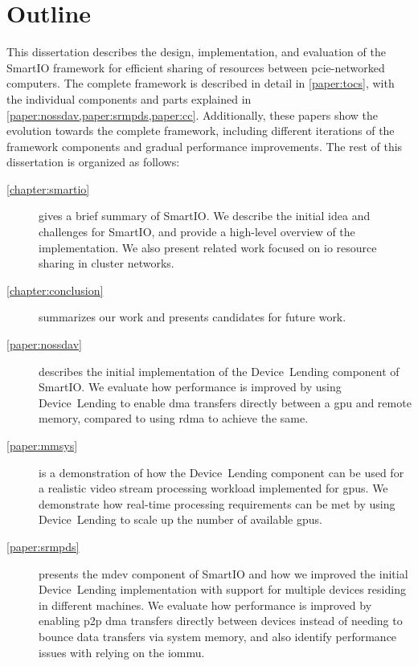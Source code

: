 \section{Outline}
This dissertation describes the design, implementation, and evaluation of the SmartIO framework for efficient sharing of resources between \gls{pcie}-networked computers.
%
The complete framework is described in detail in \cref{paper:tocs}, with the individual components and parts explained in \cref{paper:nossdav,paper:srmpds,paper:cc}.
%
Additionally, these papers show the evolution towards the complete framework, including different iterations of the framework components and gradual performance improvements.
%
The rest of this dissertation is organized as follows:
%
\begin{description}
    \item[\cref{chapter:smartio}]
        gives a brief summary of SmartIO.
        We describe the initial idea and challenges for SmartIO, and provide a high-level overview of the implementation.
        We also present related work focused on \gls{io} resource sharing in cluster networks.

    \item[\cref{chapter:conclusion}]
        summarizes our work and presents candidates for future work.

    \item[\cref{paper:nossdav}]
        describes the initial implementation of the Device~Lending component of SmartIO.
        We evaluate how performance is improved by using Device~Lending to enable \gls{dma} transfers directly between a \gls{gpu} and remote memory, compared to using \gls{rdma} to achieve the same.

    \item[\cref{paper:mmsys}]
        is a demonstration of how the Device~Lending component can be used for a realistic video stream processing workload implemented for \glspl{gpu}.
        We demonstrate how real-time processing requirements can be met by using Device~Lending to scale up the number of available \glspl{gpu}.

    \item[\cref{paper:srmpds}]
        presents the \gls{mdev} component of SmartIO and how we improved the initial Device~Lending implementation with support for multiple devices residing in different machines. 
        We evaluate how performance is improved by enabling \gls{p2p} \gls{dma} transfers directly between devices instead of needing to bounce data transfers via system memory, and also identify performance issues with relying on the \gls{iommu}.


\end{description}
